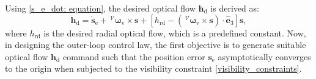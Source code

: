 \documentclass[lettersize,journal]{IEEEtran}
\begin{document}
Using \eqref{s_e_dot: equation}, the desired optical flow $\boldsymbol{h}_\text{d}$ is derived as:
\begin{equation} \label{h_des: equation}
    \boldsymbol{h}_\text{d} = \dot{\boldsymbol{s}}_\text{e} + \,^\mathcal{V} \boldsymbol{\omega}_{\text{v}} \times \boldsymbol{s} + \left[h_\text{rd} - \left(\,^\mathcal{V} \boldsymbol{\omega}_{\text{v}} \times \boldsymbol{s} \right) \cdot \hat{\boldsymbol{e}}_3 \right] \boldsymbol{s},
\end{equation}
where $h_\text{rd}$ is the desired radial optical flow, which is a predefined constant.
Now, in designing the outer-loop control law, the first objective is to generate suitable optical flow $\boldsymbol{h}_\text{d}$ command such that the position error $\boldsymbol{s}_\text{e}$ asymptotically converges to the origin when subjected to the visibility constraint \eqref{visibility_constraints}.
\end{document}
